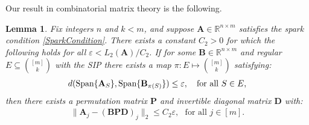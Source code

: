 \documentclass[9pt,twocolumn]{pnas-new}
\newtheorem{lemma}{Lemma}
\begin{document}

Our result in combinatorial matrix theory is the following.


\begin{lemma}\label{MainLemma}
Fix integers $n$ and $k < m$, and suppose $\mathbf{A} \in \mathbb{R}^{n \times m}$ satisfies the spark condition \eqref{SparkCondition}. There exists a constant $C_2 > 0$ for which the following holds for all $\varepsilon < L_2(\mathbf{A}) / C_2$. If for some  $\mathbf{B} \in \mathbb{R}^{n \times m}$ and regular $E \subseteq {[m] \choose k}$ with the SIP there exists a map $\pi: E \mapsto {[m] \choose k}$ satisfying:
\begin{align}\label{GapUpperBound}
d(\text{\rm Span}\{\mathbf{A}_{S}\}, \text{\rm Span}\{\mathbf{B}_{\pi(S)}\}) \leq \varepsilon,\ \ \   \text{for all $S \in E$},
\end{align}
%
then there exists a permutation matrix $\mathbf{P}$ and invertible diagonal matrix $\mathbf{D}$ with:
\begin{align}\label{MainLemmaBPD}
\|\mathbf{A}_j - (\mathbf{BPD})_j\|_2 \leq C_2 \varepsilon, \ \ \  \text{for all } j \in [m].
\end{align}
\end{lemma}
\end{document}

